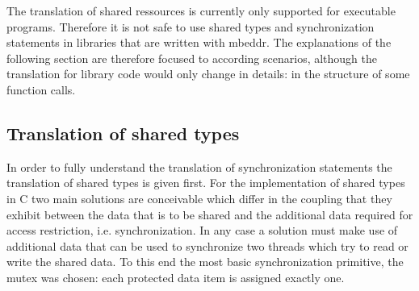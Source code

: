 The translation of shared ressources is currently only supported for executable programs. Therefore it is not safe to use shared types and synchronization statements in libraries that are written with mbeddr. The explanations of the following section are therefore focused to according scenarios, although the translation for library code would only change in details: in the structure of some function calls.

\subsection{Translation of shared types}
In order to fully understand the translation of synchronization statements the translation of shared types is given first. For the implementation of shared types in C two main solutions are conceivable which differ in the coupling that they exhibit between the data that is to be shared and the additional data required for access restriction, i.e. synchronization. In any case a solution must make use of additional data that can be used to synchronize two threads which try to read or write the shared data. To this end the most basic synchronization primitive, the mutex was chosen: each protected data item is assigned exactly one. 

